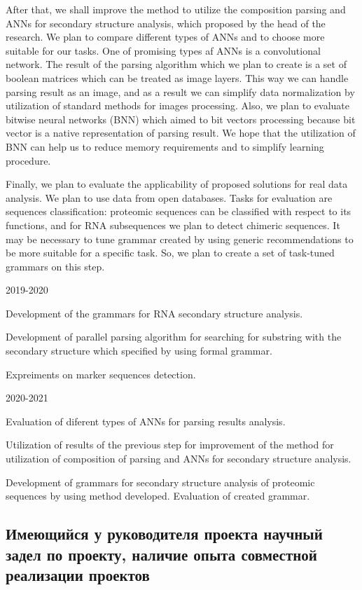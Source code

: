 \documentclass[12pt]{article}  %
\theoremstyle{remark}
\begin{document}
After that, we shall improve the method to utilize the composition parsing and ANNs for secondary structure analysis, which proposed by the head of the research.
We plan to compare different types of ANNs and to choose more suitable for our tasks.
One of promising types af ANNs is a convolutional network.
The result of the parsing algorithm which we plan to create is a set of boolean matrices which can be treated as image layers.
This way we can handle parsing result as an image, and as a result we can simplify data normalization by utilization of standard methods for images processing.
Also, we plan to evaluate bitwise neural networks (BNN) which aimed to bit vectors processing because bit vector is a native representation of parsing result. We hope that the utilization of BNN can help us to reduce memory requirements and to simplify learning procedure.

Finally, we plan to evaluate the applicability of proposed solutions for real data analysis.
We plan to use data from open databases.
Tasks for evaluation are sequences classification: proteomic sequences can be classified with respect to its functions, and for RNA subsequences we plan to detect chimeric sequences.
It may be necessary to tune grammar created by using generic recommendations to be more suitable for a specific task. So, we plan to create a set of task-tuned grammars on this step.

2019-2020

Development of the grammars for RNA secondary structure analysis.

Development of parallel parsing algorithm for searching for substring with the secondary structure which specified by using formal grammar.

Expreiments on marker sequences detection.


2020-2021

Evaluation of diferent types of ANNs for parsing results analysis.

Utilization of results of the previous step for improvement of the method for utilization of composition of parsing and ANNs for secondary structure analysis.

Development of grammars for secondary structure analysis of proteomic sequences by using method developed. Evaluation of created grammar.

\subsection{Имеющийся у руководителя проекта научный задел по проекту, наличие опыта совместной реализации проектов}
\end{document}
